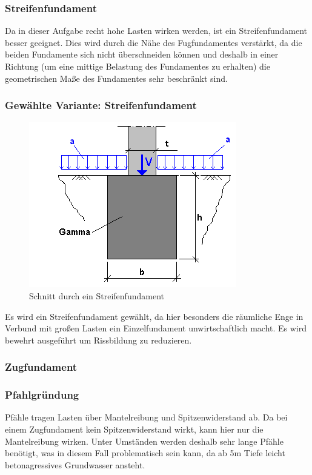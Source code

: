 \documentclass[11pt,fleqn,a4paper,halfparskip]{article}
\begin{document}
\subsubsection*{Streifenfundament}
Da in dieser Aufgabe recht hohe Lasten wirken werden, ist ein Streifenfundament besser geeignet. Dies wird durch die Nähe des Fugfundamentes verstärkt, da die beiden Fundamente sich nicht überschneiden können und deshalb in einer Richtung (um eine mittige Belastung des Fundamentes zu erhalten) die geometrischen Maße des Fundamentes sehr beschränkt sind.
\subsubsection*{Gewählte Variante: Streifenfundament}
\begin{figure}[h!]
\includegraphics[scale=2]{Streifenfundament.png}
\caption{Schnitt durch ein Streifenfundament \cite{streifenfundament}}
\end{figure}
Es wird ein Streifenfundament gewählt, da hier besonders die räumliche Enge in Verbund mit großen Lasten ein Einzelfundament unwirtschaftlich macht. Es wird bewehrt ausgeführt um Rissbildung zu reduzieren. 
\subsubsection{Zugfundament}
\subsubsection*{Pfahlgründung}
Pfähle tragen Lasten über Mantelreibung und Spitzenwiderstand ab. Da bei einem Zugfundament kein Spitzenwiderstand wirkt, kann hier nur die Mantelreibung wirken. Unter Umständen werden deshalb sehr lange Pfähle benötigt, was in diesem Fall problematisch sein kann, da ab 5m Tiefe leicht betonagressives Grundwasser ansteht.
\end{document}
